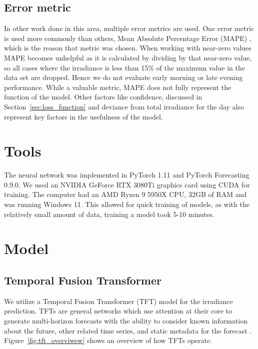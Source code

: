 \subsection{Error metric}
In other work done in this area, multiple error metrics are used. One error metric is used more commonly than others, Mean Absolute Percentage Error (MAPE) \cite{lin_temporal_2020, lee_forecasting_2018, jaidee_very_2019, su_machine_2019}, which is the reason that metric was chosen.
When working with near-zero values MAPE becomes unhelpful as it is calculated by dividing by that near-zero value, so all cases where the irradiance is less than 15\% of the maximum value in the data set are dropped. Hence we do not evaluate early morning or late evening performance.
While a valuable metric, MAPE does not  fully represent the function of the model. Other factors like confidence, discussed in Section~\ref{sec:loss_function} and deviance from total irradiance for the day also represent key factors in the usefulness of the model.




\section{Tools}
The neural network was implemented in PyTorch 1.11 and PyTorch Forecasting 0.9.0. We used an NVIDIA GeForce RTX 3080Ti graphics card using CUDA for training. The computer had an AMD Ryzen 9 5950X CPU, 32GB of RAM and was running Windows 11.
This allowed for quick training of models, as with the relatively small amount of data, training a model took 5-10 minutes.


\section{Model}
    \subsection{Temporal Fusion Transformer}
    
    \noindent We utilize a Temporal Fusion Transformer (TFT) model for the irradiance prediction.
    TFTs are  general networks which use attention at their core to generate multi-horizon forecasts with the ability to consider
    known information about the future, other related time series, and static metadata for the forecast \cite{lim_temporal_2020}. Figure~\ref{fig:tft_overviwew} shows an overview of how TFTs operate.
    
